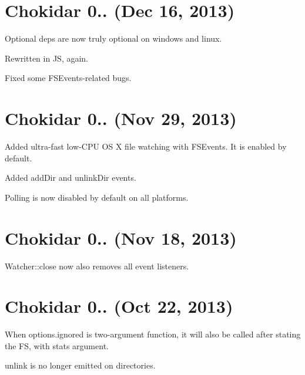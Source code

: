 \section*{Chokidar 0.. (Dec 16, 2013)}


\begin{DoxyItemize}
\item Optional deps are now truly optional on windows and linux.
\item Rewritten in JS, again.
\item Fixed some F\+S\+Events-\/related bugs.
\end{DoxyItemize}

\section*{Chokidar 0.. (Nov 29, 2013)}


\begin{DoxyItemize}
\item Added ultra-\/fast low-\/\+C\+PU OS X file watching with F\+S\+Events. It is enabled by default.
\item Added {\ttfamily add\+Dir} and {\ttfamily unlink\+Dir} events.
\item Polling is now disabled by default on all platforms.
\end{DoxyItemize}

\section*{Chokidar 0.. (Nov 18, 2013)}


\begin{DoxyItemize}
\item {\ttfamily Watcher\+::close} now also removes all event listeners.
\end{DoxyItemize}

\section*{Chokidar 0.. (Oct 22, 2013)}


\begin{DoxyItemize}
\item When {\ttfamily options.\+ignored} is two-\/argument function, it will also be called after stating the FS, with {\ttfamily stats} argument.
\item {\ttfamily unlink} is no longer emitted on directories.
\end{DoxyItemize}

